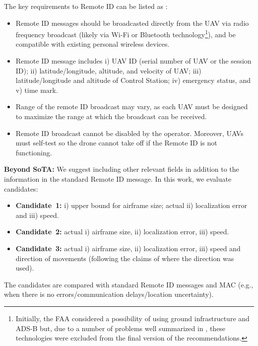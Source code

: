 \documentclass[10pt,conference]{IEEEtran}
\begin{document}
The key requirements to Remote ID can be listed as \cite{Drone_ID}:
\begin{itemize}
    \item Remote ID messages should be broadcasted directly from the UAV via radio frequency broadcast (likely via Wi-Fi or Bluetooth technology\footnote{Initially, the FAA considered a possibility of using ground infrastructure and ADS-B but, due to a number of problems well summarized in \cite{Vinogradov20}, these technologies were excluded from the final version of the recommendations.}), and be compatible with existing personal wireless devices.
    \item Remote ID message includes i) UAV ID (serial number of UAV or the session ID); ii) latitude/longitude, altitude, and velocity of UAV; iii) latitude/longitude and altitude of Control Station; iv) emergency status, and v) time mark.
    \item Range of the remote ID broadcast may vary, as each UAV must be designed to maximize the range at which the broadcast can be received.
    \item Remote ID broadcast cannot be disabled by the operator. Moreover, UAVs must self-test so the drone cannot take off if the Remote ID is not functioning.
\end{itemize}
\textbf{Beyond SoTA:}
We suggest including other relevant fields in addition to the information in the standard Remote ID message. In this work, we evaluate candidates:
\begin{itemize}
    \item \textbf{Candidate~1:} i) upper bound for airframe size; actual ii) localization error and iii) speed.
    \item \textbf{Candidate~2:} actual i) airframe size, ii) localization error, iii) speed.
\item \textbf{Candidate~3:} actual i) airframe size, ii) localization error, iii) speed and direction of movements (following the claims of \cite{hu2020} where the direction was used).
\end{itemize}
The candidates are compared with standard Remote ID messages and MAC (e.g., when there is no errors/communication delays/location uncertainty).
\end{document}
